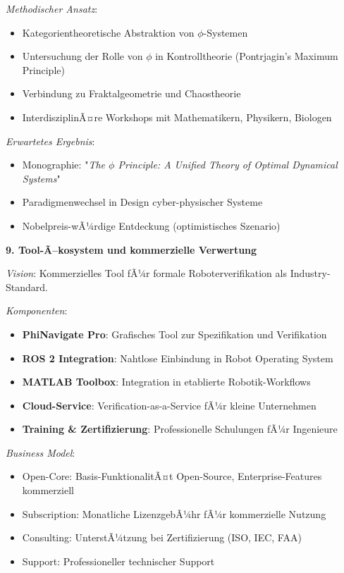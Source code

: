 ﻿\documentclass[a4paper,12pt]{article}
\theoremstyle{definition}
\begin{document}
\textit{Methodischer Ansatz}:
\begin{itemize}
	\item Kategorientheoretische Abstraktion von $\phi$-Systemen
	\item Untersuchung der Rolle von $\phi$ in Kontrolltheorie (Pontrjagin's Maximum Principle)
	\item Verbindung zu Fraktalgeometrie und Chaostheorie
	\item InterdisziplinÃ¤re Workshops mit Mathematikern, Physikern, Biologen
\end{itemize}

\textit{Erwartetes Ergebnis}:
\begin{itemize}
	\item Monographie: "\textit{The $\phi$ Principle: A Unified Theory of Optimal Dynamical Systems}"
	\item Paradigmenwechsel in Design cyber-physischer Systeme
	\item Nobelpreis-wÃ¼rdige Entdeckung (optimistisches Szenario)
\end{itemize}

\textbf{9. Tool-Ã–kosystem und kommerzielle Verwertung}

\textit{Vision}: Kommerzielles Tool fÃ¼r formale Roboterverifikation als Industry-Standard.

\textit{Komponenten}:
\begin{itemize}
	\item \textbf{PhiNavigate Pro}: Grafisches Tool zur Spezifikation und Verifikation
	\item \textbf{ROS 2 Integration}: Nahtlose Einbindung in Robot Operating System
	\item \textbf{MATLAB Toolbox}: Integration in etablierte Robotik-Workflows
	\item \textbf{Cloud-Service}: Verification-as-a-Service fÃ¼r kleine Unternehmen
	\item \textbf{Training \& Zertifizierung}: Professionelle Schulungen fÃ¼r Ingenieure
\end{itemize}

\textit{Business Model}:
\begin{itemize}
	\item Open-Core: Basis-FunktionalitÃ¤t Open-Source, Enterprise-Features kommerziell
	\item Subscription: Monatliche LizenzgebÃ¼hr fÃ¼r kommerzielle Nutzung
	\item Consulting: UnterstÃ¼tzung bei Zertifizierung (ISO, IEC, FAA)
	\item Support: Professioneller technischer Support
\end{itemize}
\end{document}
